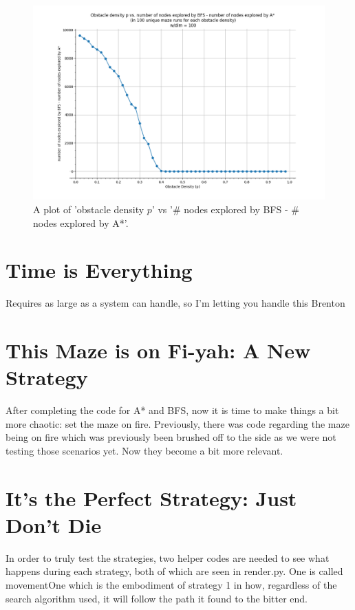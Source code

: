 \documentclass[11pt]{article}
\begin{document}
\begin{figure}[h]
\centering
\includegraphics[scale=0.55]{graphs/obstacleDensity_vs_nodesBFSminusNodesAstar.PNG}
\caption{A plot of 'obstacle density $p$' vs '\# nodes explored by BFS - \# nodes explored by A*'.}
\label{BFS-A}
\end{figure}

	\pagebreak
\section{Time is Everything}
Requires as large as a system can handle, so I'm letting you handle this Brenton
	\pagebreak
\section{This Maze is on Fi-yah: A New Strategy}
After completing the code for A* and BFS, now it is time to make things a bit more chaotic: set the maze on fire. Previously, there was code regarding the maze being on fire which was previously been brushed off to the side as we were not testing those scenarios yet. Now they become a bit more relevant.
	\pagebreak
\section{It's the Perfect Strategy: Just Don't Die}
In order to truly test the strategies, two helper codes are needed to see what happens during each strategy, both of which are seen in render.py. One is called movementOne which is the embodiment of strategy 1 in how, regardless of the search algorithm used, it will follow the path it found to the bitter end.
\end{document}
